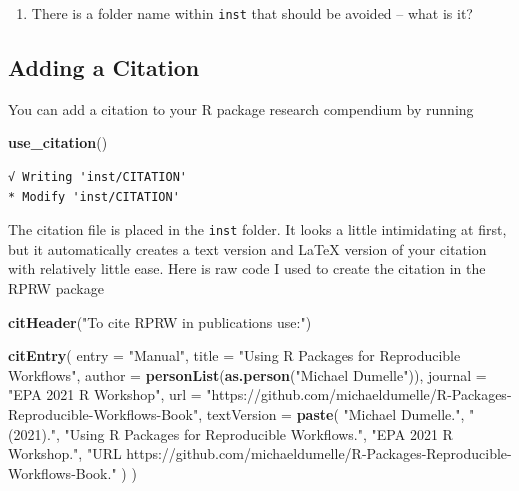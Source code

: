 \documentclass[
]{book}
\newenvironment{Shaded}{\begin{snugshade}}{\end{snugshade}}
\newcommand{\DataTypeTok}[1]{\textcolor[rgb]{0.13,0.29,0.53}{#1}}
\newcommand{\KeywordTok}[1]{\textcolor[rgb]{0.13,0.29,0.53}{\textbf{#1}}}
\newcommand{\NormalTok}[1]{#1}
\newcommand{\StringTok}[1]{\textcolor[rgb]{0.31,0.60,0.02}{#1}}
\providecommand{\tightlist}{%
  \setlength{\itemsep}{0pt}\setlength{\parskip}{0pt}}
\begin{document}
\begin{enumerate}
\def\labelenumi{\arabic{enumi}.}
\tightlist
\item
  There is a folder name within \texttt{inst} that should be avoided -- what is it?
\end{enumerate}

\hypertarget{adding-a-citation}{%
\subsection{Adding a Citation}\label{adding-a-citation}}

You can add a citation to your R package research compendium by running

\begin{Shaded}
\begin{Highlighting}[]
\KeywordTok{use_citation}\NormalTok{()}
\end{Highlighting}
\end{Shaded}

\begin{verbatim}
√ Writing 'inst/CITATION'
* Modify 'inst/CITATION'
\end{verbatim}

The citation file is placed in the \texttt{inst} folder. It looks a little intimidating at first, but it automatically creates a text version and LaTeX version of your citation with relatively little ease. Here is raw code I used to create the citation in the RPRW package

\begin{Shaded}
\begin{Highlighting}[]
\KeywordTok{citHeader}\NormalTok{(}\StringTok{"To cite RPRW in publications use:"}\NormalTok{)}

\KeywordTok{citEntry}\NormalTok{(}
  \DataTypeTok{entry    =} \StringTok{"Manual"}\NormalTok{,}
  \DataTypeTok{title    =} \StringTok{"Using R Packages for Reproducible Workflows"}\NormalTok{,}
  \DataTypeTok{author   =} \KeywordTok{personList}\NormalTok{(}\KeywordTok{as.person}\NormalTok{(}\StringTok{"Michael Dumelle"}\NormalTok{)),}
  \DataTypeTok{journal  =} \StringTok{"EPA 2021 R Workshop"}\NormalTok{,}
  \DataTypeTok{url      =} \StringTok{"https://github.com/michaeldumelle/R-Packages-Reproducible-Workflows-Book"}\NormalTok{,}
  \DataTypeTok{textVersion =}
  \KeywordTok{paste}\NormalTok{(}
    \StringTok{"Michael Dumelle."}\NormalTok{,}
    \StringTok{"(2021)."}\NormalTok{,}
    \StringTok{"Using R Packages for Reproducible Workflows."}\NormalTok{,}
    \StringTok{"EPA 2021 R Workshop."}\NormalTok{,}
    \StringTok{"URL https://github.com/michaeldumelle/R-Packages-Reproducible-Workflows-Book."}
\NormalTok{  )}
\NormalTok{)}
\end{Highlighting}
\end{Shaded}
\end{document}
